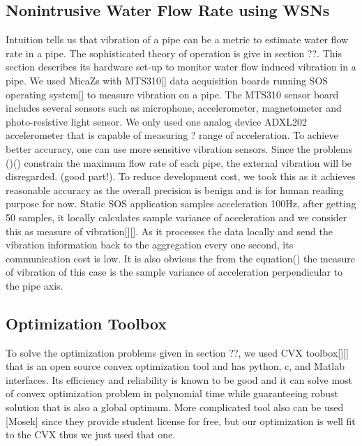 \subsection{ Nonintrusive Water Flow Rate using WSNs}
  \label{subsec:vibrationsensors}
Intuition tells us that vibration of a pipe can be a metric to estimate water flow rate in a pipe. The sophisticated theory of operation is give in section ??. This section describes its hardware set-up to monitor water flow induced vibration in a pipe. 
We used MicaZs with MTS310[] data acquisition boards running SOS operating system[] to measure vibration on a pipe. The MTS310 sensor board includes several sensors such as microphone, accelerometer, magnetometer and photo-resistive light sensor. We only used one analog device ADXL202 accelerometer that is capable of measuring ? range of acceleration. To achieve better accuracy, one can use more sensitive vibration sensors. Since the problems ()() constrain the maximum flow rate of each pipe, the external vibration will be disregarded. (good part!). To reduce development cost, we took this as it achieves reasonable accuracy as the overall precision is benign and is for human reading purpose for now. 
Static SOS application samples acceleration 100Hz, after getting 50 samples, it locally calculates sample variance of acceleration and we consider this as measure of vibration[][]. As it processes the data locally and send the vibration information back to the aggregation every one second, its communication cost is low. It is also obvious the from the equation() the measure of vibration of this case is the sample variance of acceleration perpendicular to the pipe axis.

\subsection{Optimization Toolbox}
  \label{subsec:optimizationtool}

To solve the optimization problems given in section ??, we used CVX toolbox[][] that is an open source convex optimization tool and has python, c, and Matlab interfaces. Its efficiency and reliability is known to be good and it can solve most of convex optimization problem in polynomial time while guaranteeing robust solution that is also a global optimum. More complicated tool also can be used [Mosek] since they provide student license for free, but our optimization is well fit to the CVX thus we just used that one. 

